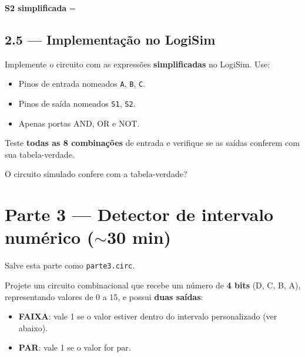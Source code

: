 \documentclass[12pt,a4paper]{article}
\newcommand{\resplinha}[1][4cm]{\underline{\hspace{#1}}}
\begin{document}
\noindent \textbf{S2 simplificada} = \resplinha[10cm]

\subsection{2.5 --- Implementação no LogiSim}

Implemente o circuito com as expressões \textbf{simplificadas} no LogiSim. Use:
\begin{itemize}[nosep]
  \item Pinos de entrada nomeados \texttt{A}, \texttt{B}, \texttt{C}.
  \item Pinos de saída nomeados \texttt{S1}, \texttt{S2}.
  \item Apenas portas AND, OR e NOT.
\end{itemize}


\noindent Teste \textbf{todas as 8 combinações} de entrada e verifique se as saídas conferem com sua tabela-verdade.

\vspace{4pt}
\noindent O circuito simulado confere com a tabela-verdade?  \resplinha[2cm]

\section{Parte 3 --- Detector de intervalo numérico ($\sim$30 min)}

\begin{tcolorbox}[colback=gray!5, colframe=gray!50, fontupper=\small]
Salve esta parte como \texttt{parte3.circ}.
\end{tcolorbox}

Projete um circuito combinacional que recebe um número de \textbf{4 bits} (D, C, B, A), representando valores de 0 a 15, e possui \textbf{duas saídas}:

\begin{itemize}[nosep]
  \item \textbf{FAIXA}: vale 1 se o valor estiver dentro do intervalo personalizado (ver abaixo).
  \item \textbf{PAR}: vale 1 se o valor for par.
\end{itemize}
\end{document}
